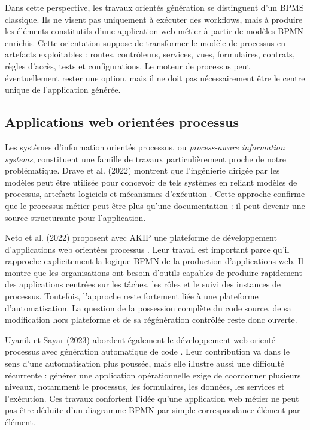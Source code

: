 Dans cette perspective, les travaux orientés génération se distinguent d'un BPMS classique. Ils ne visent pas uniquement à exécuter des workflows, mais à produire les éléments constitutifs d'une application web métier à partir de modèles BPMN enrichis. Cette orientation suppose de transformer le modèle de processus en artefacts exploitables : routes, contrôleurs, services, vues, formulaires, contrats, règles d'accès, tests et configurations. Le moteur de processus peut éventuellement rester une option, mais il ne doit pas nécessairement être le centre unique de l'application générée.

\subsection{Applications web orientées processus}

Les systèmes d'information orientés processus, ou \textit{process-aware information systems}, constituent une famille de travaux particulièrement proche de notre problématique. Drave et al. (2022) montrent que l'ingénierie dirigée par les modèles peut être utilisée pour concevoir de tels systèmes en reliant modèles de processus, artefacts logiciels et mécanismes d'exécution \cite{drave2022}. Cette approche confirme que le processus métier peut être plus qu'une documentation : il peut devenir une source structurante pour l'application.

Neto et al. (2022) proposent avec AKIP une plateforme de développement d'applications web orientées processus \cite{neto2022}. Leur travail est important parce qu'il rapproche explicitement la logique BPMN de la production d'applications web. Il montre que les organisations ont besoin d'outils capables de produire rapidement des applications centrées sur les tâches, les rôles et le suivi des instances de processus. Toutefois, l'approche reste fortement liée à une plateforme d'automatisation. La question de la possession complète du code source, de sa modification hors plateforme et de sa régénération contrôlée reste donc ouverte.

Uyanik et Sayar (2023) abordent également le développement web orienté processus avec génération automatique de code \cite{uyanik2023}. Leur contribution va dans le sens d'une automatisation plus poussée, mais elle illustre aussi une difficulté récurrente : générer une application opérationnelle exige de coordonner plusieurs niveaux, notamment le processus, les formulaires, les données, les services et l'exécution. Ces travaux confortent l'idée qu'une application web métier ne peut pas être déduite d'un diagramme BPMN par simple correspondance élément par élément.

